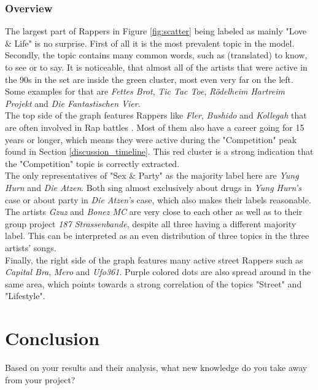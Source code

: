 \documentclass[conference]{IEEEtran}
\begin{document}
\subsubsection{Overview}
The largest part of Rappers in Figure \ref{fig:scatter} being labeled as mainly "Love \& Life" is no surprise. First of all it is the most prevalent topic in the model. Secondly, the topic contains many common words, such as (translated) to know, to see or to say. It is noticeable, that almost all of the artists that were active in the 90s in the set are inside the green cluster, most even very far on the left. Some examples for that are \textit{Fettes Brot}, \textit{Tic Tac Toe}, \textit{R\"odelheim Hartreim Projekt} and \textit{Die Fantastischen Vier}.\\
The top side of the graph features Rappers like \textit{Fler}, \textit{Bushido} and \textit{Kollegah} that are often involved in Rap battles \cite{battles}. Most of them also have a career going for 15 years or longer, which means they were active during the "Competition" peak found in Section \ref{discussion_timeline}. This red cluster is a strong indication that the "Competition" topic is correctly extracted.\\
The only representatives of "Sex \& Party" as the majority label here are \textit{Yung Hurn} and \textit{Die Atzen}. Both sing almost exclusively about drugs in \textit{Yung Hurn's} case or about party in \textit{Die Atzen's} case, which also makes their labels reasonable.\\
The artists \textit{Gzuz} and \textit{Bonez MC} are very close to each other as well as to their group project \textit{187 Strassenbande}, despite all three having a different majority label. This can be interpreted as an even distribution of three topics in the three artists' songs.\\
Finally, the right side of the graph features many active street Rappers \cite{strassenrap} such as \textit{Capital Bra}, \textit{Mero} and \textit{Ufo361}. Purple colored dots are also spread around in the same area, which points towards a strong correlation of the topics "Street" and "Lifestyle".

\section{Conclusion}
Based on your results and their analysis, what new knowledge do you
take away from your project?

{
\balance{
  
  
  }
}
\end{document}
